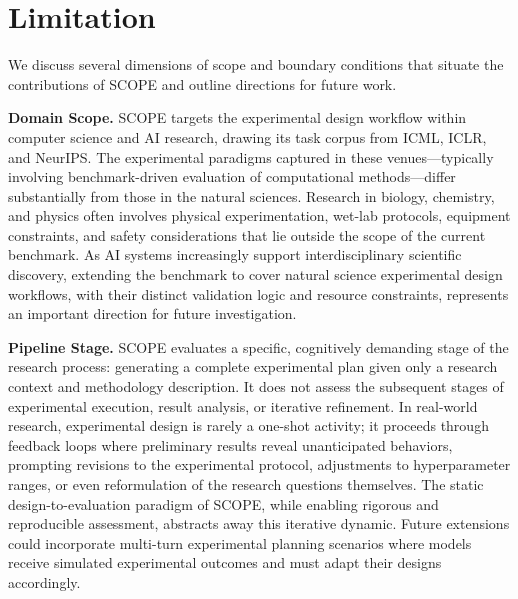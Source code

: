 \section{Limitation}

We discuss several dimensions of scope and boundary conditions that situate the contributions of \textsc{SCOPE} and outline directions for future work.

\textbf{Domain Scope.} \textsc{SCOPE} targets the experimental design workflow within computer science and AI research, drawing its task corpus from ICML, ICLR, and NeurIPS. The experimental paradigms captured in these venues---typically involving benchmark-driven evaluation of computational methods---differ substantially from those in the natural sciences. Research in biology, chemistry, and physics often involves physical experimentation, wet-lab protocols, equipment constraints, and safety considerations that lie outside the scope of the current benchmark. As AI systems increasingly support interdisciplinary scientific discovery, extending the benchmark to cover natural science experimental design workflows, with their distinct validation logic and resource constraints, represents an important direction for future investigation.

\textbf{Pipeline Stage.} \textsc{SCOPE} evaluates a specific, cognitively demanding stage of the research process: generating a complete experimental plan given only a research context and methodology description. It does not assess the subsequent stages of experimental execution, result analysis, or iterative refinement. In real-world research, experimental design is rarely a one-shot activity; it proceeds through feedback loops where preliminary results reveal unanticipated behaviors, prompting revisions to the experimental protocol, adjustments to hyperparameter ranges, or even reformulation of the research questions themselves. The static design-to-evaluation paradigm of \textsc{SCOPE}, while enabling rigorous and reproducible assessment, abstracts away this iterative dynamic. Future extensions could incorporate multi-turn experimental planning scenarios where models receive simulated experimental outcomes and must adapt their designs accordingly.

